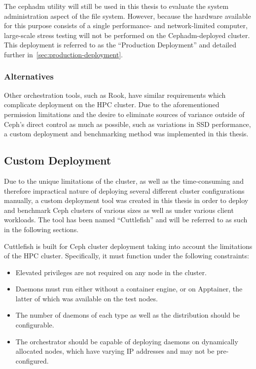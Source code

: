 The cephadm utility will still be used in this thesis to evaluate the
system administration aspect of the file system. However, because the hardware available for this purpose consists of a single performance- and network-limited computer, large-scale stress testing will not be performed on the Cephadm-deployed cluster. This deployment is referred to as the
\enquote{Production Deployment} and detailed further in~\cref{sec:production-deployment}.

\subsubsection{Alternatives}

Other orchestration tools, such as Rook, have similar requirements which complicate deployment on the \ac{HPC} cluster. Due to the aforementioned permission limitations and the desire to eliminate sources of variance outside of Ceph's direct control as much as possible, such as variations in \ac{SSD} performance, a custom deployment and benchmarking method was implemented in this thesis.

\subsection{Custom Deployment}
\label{sec:custom-deployment}

Due to the unique limitations of the cluster, as well as the time-consuming and therefore impractical nature of deploying several different cluster configurations manually, a custom deployment tool was created in this thesis in order to deploy and benchmark Ceph clusters of various sizes as well as under various client workloads. The tool has been named \enquote{Cuttlefish} and will be referred to as such in the following sections.

Cuttlefish is built for Ceph cluster deployment taking into account the limitations of the \ac{HPC} cluster. Specifically, it must function under the following constraints:

\begin{itemize}
    \item Elevated privileges are not required on any node in the cluster.
    \item Daemons must run either without a container engine, or on Apptainer, the latter of which was available on the test nodes.
    \item The number of daemons of each type as well as the distribution should be configurable.
    \item The orchestrator should be capable of deploying daemons on dynamically allocated nodes, which have varying \ac{IP} addresses and may not be pre-configured.
\end{itemize}

